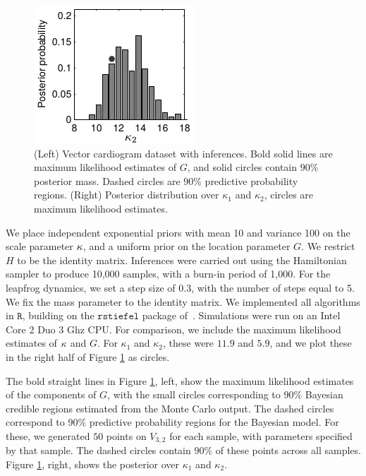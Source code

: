 \begin{figure}
\begin{minipage}{0.4\textwidth}
  \centering
    \includegraphics{figs/plot_vcg_kap2_bw.pdf}
  \end{minipage}
\caption{(Left) Vector cardiogram dataset with inferences. Bold solid lines are maximum likelihood estimates of $G$, and solid circles
 contain $90\%$ posterior mass. Dashed circles are $90\%$ predictive probability regions.
 (Right) Posterior distribution over $\kappa_1$ and $\kappa_2$, circles are maximum likelihood estimates.}
  \label{fig:vcg_data}
  \end{figure}

We place independent exponential priors with mean 10 and variance 100 on the scale parameter $\kappa$, and a uniform prior on the location
parameter $G$. We restrict $H$ to be the identity matrix. Inferences were carried out using the Hamiltonian sampler to produce 10,000 samples, with a
burn-in period of 1,000. For the leapfrog dynamics, we set a step size of $0.3$, with the number of steps equal to 5.
We fix the mass parameter to the identity matrix.
We implemented all algorithms in $\mathtt{R}$, building on
the $\mathtt{rstiefel}$ package of~\cite{hoff2009}. 
Simulations were run on an Intel Core 2 Duo 3 Ghz CPU.
For comparison, we include the maximum likelihood estimates of $\kappa$ and $G$. %
For  $\kappa_1$ and $\kappa_2$, these were $11.9$ and $5.9$, and we plot these in the right half of Figure \ref{fig:vcg_data}
as circles. 

The bold straight lines in Figure \ref{fig:vcg_data}, left, show the maximum likelihood estimates of the components of $G$, with the small
circles corresponding to $90\%$ Bayesian credible regions
estimated from the Monte Carlo output.
The dashed circles correspond to $90\%$ predictive probability regions for the Bayesian model. For these, we generated  $50$ points on $V_{3,2}$ for 
each sample, with parameters specified by that sample. The dashed circles contain $90\%$ of these points across all samples.
Figure \ref{fig:vcg_data}, right, shows the posterior over $\kappa_1$ and $\kappa_2$.

